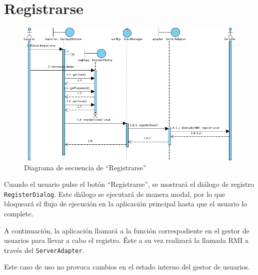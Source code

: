 \section{Registrarse}

\begin{figure}[ht]
\centering
\includegraphics[scale=0.6]{img/ch03devel-register.png}
\caption{Diagrama de secuencia de ``Registrarse''}
\end{figure}

Cuando el usuario pulse el botón ``Registrarse'', se mostrará el diálogo de
registro \texttt{RegisterDialog}. Este diálogo se ejecutará de manera modal,
por lo que bloqueará el flujo de ejecución en la aplicación principal hasta que
el usuario lo complete.

A continuación, la aplicación llamará a la función correspodiente en el gestor
de usuarios para llevar a cabo el registro. Éste a su vez realizará la llamada
RMI a través del \texttt{ServerAdapter}.

Este caso de uso no provoca cambios en el estado interno del gestor de usuarios.
